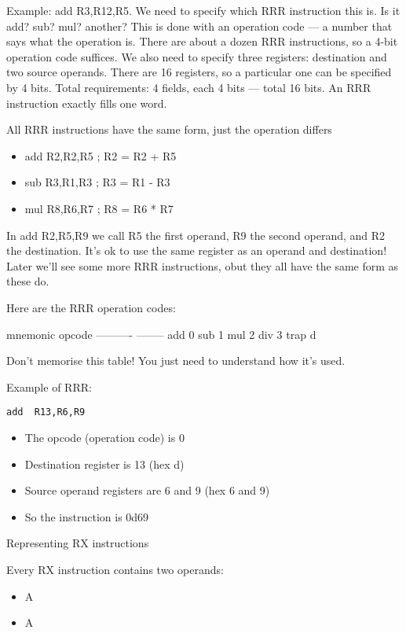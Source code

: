 \documentclass[11pt]{article}
\begin{document}
\begin{itemize}
Example: add R3,R12,R5.  We need to specify \alert{which} RRR
instruction this is.  Is it add? sub? mul? another?  This is done with
an operation code --- a number that says what the operation is.  There
are about a dozen RRR instructions, so a 4-bit operation code
suffices.  We also need to specify three registers: destination and
two source operands.  There are 16 registers, so a particular one can
be specified by 4 bits.  Total requirements: 4 fields, each 4 bits ---
total 16 bits.  An RRR instruction exactly fills one word.

All RRR instructions have the same form, just the operation
differs

\begin{itemize}
\item add  R2,R2,R5     ; R2 = R2 + R5
\item sub  R3,R1,R3     ; R3 = R1 - R3
\item mul  R8,R6,R7     ; R8 = R6 * R7
\end{itemize}

In add R2,R5,R9 we call R5 the first operand, R9 the second operand,
and R2 the destination.  It's ok to use the same register as an
operand and destination!  Later we'll see some more RRR instructions,
obut they all have the same form as these do.

Here are the RRR operation codes:

 mnemonic   opcode
---------- --------
 add        0
 sub        1
 mul        2
 div        3
 trap       d

Don't memorise this table!  You just need to understand how it's used.

Example of RRR:

\begin{verbatim}
add  R13,R6,R9
\end{verbatim}

\begin{itemize}
\item The opcode (operation code) is 0
\item Destination register is 13 (hex d)
\item Source operand registers are 6 and 9 (hex 6 and 9)
\item So the instruction is  0d69
\end{itemize}

Representing RX instructions

Every RX instruction contains two operands:

\begin{itemize}
\item A 
\item A 
\end{itemize}


\end{itemize}
\end{document}
